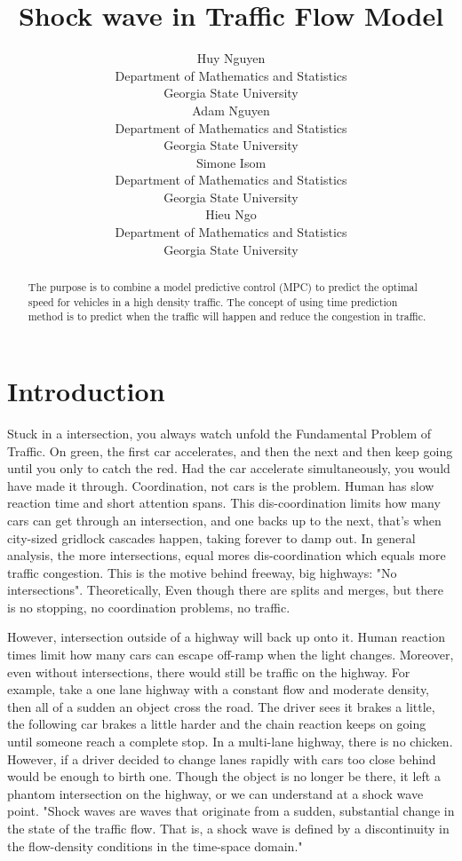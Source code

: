 \documentclass{article}
\title{Shock wave in Traffic Flow Model}
\author{
  Huy Nguyen \\
  Department of Mathematics and Statistics\\
  Georgia State University\\
   \And
  Adam Nguyen \\
  Department of Mathematics and Statistics\\
  Georgia State University\\
   \And
  Simone Isom \\
  Department of Mathematics and Statistics\\
  Georgia State University\\
  \And
  Hieu Ngo \\
  Department of Mathematics and Statistics\\
  Georgia State University\\
}
\begin{document}
\maketitle

\begin{abstract}
The purpose is to combine a model predictive control (MPC) to predict the optimal speed for vehicles in a high density traffic. The concept of using time prediction method is to predict when the traffic will happen and reduce the congestion in traffic.
\end{abstract}



\section*{Introduction}
 Stuck in a intersection, you always watch unfold the Fundamental Problem of Traffic. On green, the first car accelerates, and then the next and then keep going until you only to catch the red. Had the car accelerate simultaneously, you would have made it through. Coordination, not cars is the problem. Human has slow reaction time and short attention spans. This dis-coordination limits how many cars can get through an intersection, and one backs up to the next, that's when city-sized gridlock cascades happen, taking forever to damp out. In general analysis, the more intersections, equal mores dis-coordination which equals more traffic congestion. This is the motive behind freeway, big highways: "No intersections". Theoretically, Even though there are splits and merges, but there is no stopping, no coordination problems, no traffic.
 
 
 However, intersection outside of a highway will back up onto it. Human reaction times limit how many cars can escape off-ramp when the light changes. Moreover, even without intersections, there would still be traffic on the highway. For example, take a one lane highway with a constant flow and moderate density, then all of a sudden an object cross the road. The driver sees it brakes a little, the following car brakes a little harder and the chain reaction keeps on going until someone reach a complete stop. In a multi-lane highway, there is no chicken. However, if a driver decided to change lanes rapidly with cars too close behind would be enough to birth one. Though the object is no longer be there, it left a phantom intersection on the highway, or we can understand at a shock wave point. "Shock waves are waves that originate from a sudden, substantial change in the state of the traffic flow. That is, a shock wave is defined by a discontinuity in the flow-density conditions in the time-space domain."
 
\end{document}
